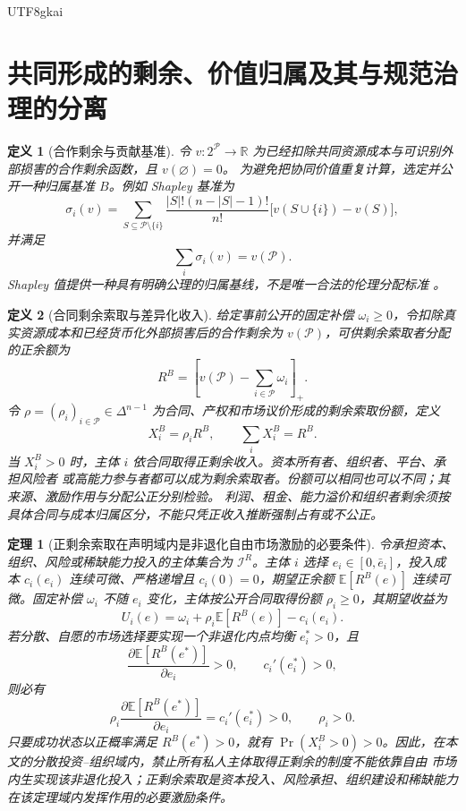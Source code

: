 \documentclass[12pt,a4paper,openany]{report}
\newtheorem{definition}{定义}[chapter]
\newtheorem{theorem}{定理}[chapter]
\newcommand{\RR}{\mathbb R}
\newcommand{\EE}{\mathbb E}
\newcommand{\Part}{\mathcal P}
\begin{document}
\begin{CJK*}{UTF8}{gkai}
\section{共同形成的剩余、价值归属及其与规范治理的分离}

\begin{definition}[合作剩余与贡献基准]
令 \(v:2^{\Part}\to\RR\) 为已经扣除共同资源成本与可识别外部损害的合作剩余函数，且 \(v(\varnothing)=0\)。
为避免把协同价值重复计算，选定并公开一种归属基准 \(B\)。例如 Shapley 基准为
\[
  \sigma_i(v)
  =\sum_{S\subseteq\Part\setminus\{i\}}
  \frac{|S|!(n-|S|-1)!}{n!}
  \bigl[v(S\cup\{i\})-v(S)\bigr],
\]
并满足
\[
  \sum_i\sigma_i(v)=v(\Part).
\]
Shapley 值提供一种具有明确公理的归属基线，不是唯一合法的伦理分配标准
\cite{Shapley1953Value}。
\end{definition}

\begin{definition}[合同剩余索取与差异化收入]
\label{def:neutral-surplus-exploitation}
给定事前公开的固定补偿 \(\omega_i\ge0\)，令扣除真实资源成本和已经货币化外部损害后的合作剩余为
\(v(\Part)\)，可供剩余索取者分配的正余额为
\[
  R^B
  =\left[v(\Part)-\sum_{i\in\Part}\omega_i\right]_+.
\]
令 \(\rho=(\rho_i)_{i\in\Part}\in\Delta^{n-1}\) 为合同、产权和市场议价形成的剩余索取份额，定义
\[
  X_i^B=\rho_iR^B,
  \qquad
  \sum_iX_i^B=R^B.
\]
当 \(X_i^B>0\) 时，主体 \(i\) 依合同取得正剩余收入。资本所有者、组织者、平台、承担风险者
或高能力参与者都可以成为剩余索取者。份额可以相同也可以不同；其来源、激励作用与分配公正分别检验。
利润、租金、能力溢价和组织者剩余须按具体合同与成本归属区分，不能只凭正收入推断强制占有或不公正。
\end{definition}

\begin{theorem}[正剩余索取在声明域内是非退化自由市场激励的必要条件]
\label{thm:residual-claim-incentive-necessity}
令承担资本、组织、风险或稀缺能力投入的主体集合为 \(\mathcal I^R\)。主体 \(i\) 选择
\(e_i\in[0,\bar e_i]\)，投入成本 \(c_i(e_i)\) 连续可微、严格递增且 \(c_i(0)=0\)，期望正余额
\(\EE[R^B(e)]\) 连续可微。固定补偿 \(\omega_i\) 不随 \(e_i\) 变化，主体按公开合同取得份额
\(\rho_i\ge0\)，其期望收益为
\[
  U_i(e)
  =\omega_i+\rho_i\EE[R^B(e)]-c_i(e_i).
\]
若分散、自愿的市场选择要实现一个非退化内点均衡 \(e_i^*>0\)，且
\[
  \frac{\partial\EE[R^B(e^*)]}{\partial e_i}>0,
  \qquad
  c_i'(e_i^*)>0,
\]
则必有
\[
  \rho_i
  \frac{\partial\EE[R^B(e^*)]}{\partial e_i}
  =c_i'(e_i^*)>0,
  \qquad
  \rho_i>0.
\]
只要成功状态以正概率满足 \(R^B(e^*)>0\)，就有
\(\Pr(X_i^B>0)>0\)。因此，在本文的分散投资--组织域内，禁止所有私人主体取得正剩余的制度不能依靠自由
市场内生实现该非退化投入；正剩余索取是资本投入、风险承担、组织建设和稀缺能力
在该定理域内发挥作用的必要激励条件。
\end{theorem}


\end{CJK*}
\end{document}
